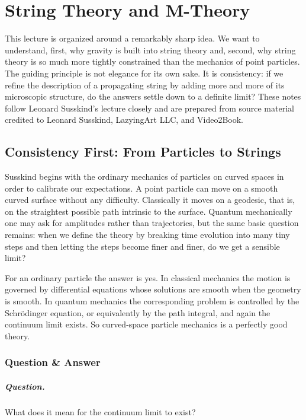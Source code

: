 \chapter{String Theory and M-Theory}

This lecture is organized around a remarkably sharp idea. We want to understand, first, why gravity is built into string theory and, second, why string theory is so much more tightly constrained than the mechanics of point particles. The guiding principle is not elegance for its own sake. It is consistency: if we refine the description of a propagating string by adding more and more of its microscopic structure, do the answers settle down to a definite limit? These notes follow Leonard Susskind's lecture closely and are prepared from source material credited to Leonard Susskind, LazyingArt LLC, and Video2Book.

\section{Consistency First: From Particles to Strings}

Susskind begins with the ordinary mechanics of particles on curved spaces in order to calibrate our expectations. A point particle can move on a smooth curved surface without any difficulty. Classically it moves on a geodesic, that is, on the straightest possible path intrinsic to the surface. Quantum mechanically one may ask for amplitudes rather than trajectories, but the same basic question remains: when we define the theory by breaking time evolution into many tiny steps and then letting the steps become finer and finer, do we get a sensible limit?

For an ordinary particle the answer is yes. In classical mechanics the motion is governed by differential equations whose solutions are smooth when the geometry is smooth. In quantum mechanics the corresponding problem is controlled by the Schr\"odinger equation, or equivalently by the path integral, and again the continuum limit exists. So curved-space particle mechanics is a perfectly good theory.

\subsection{Question \& Answer}

\paragraph{Question.} What does it mean for the continuum limit to exist?

